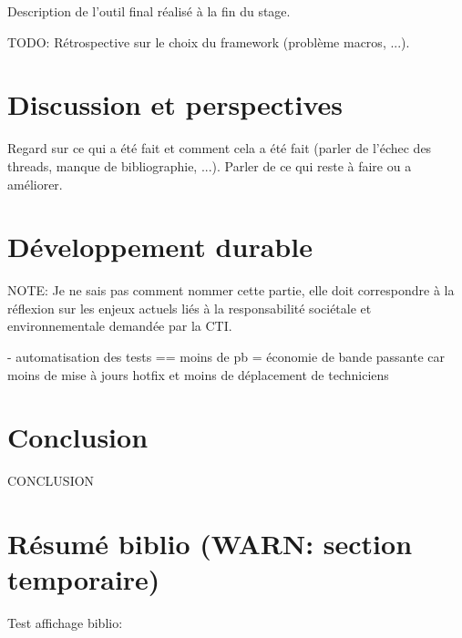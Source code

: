 \documentclass[a4paper]{article}
\begin{document}
Description de l'outil final réalisé à la fin du stage.

TODO: Rétrospective sur le choix du framework (problème macros, ...).

\clearpage

\section{Discussion et perspectives}

Regard sur ce qui a été fait et comment cela a été fait (parler de l'échec
des threads, manque de bibliographie, ...). Parler de ce qui reste à faire ou a
améliorer.

\clearpage

\section{Développement durable}

NOTE: Je ne sais pas comment nommer cette partie, elle doit correspondre à la
réflexion sur les enjeux actuels liés à la responsabilité sociétale et
environnementale demandée par la CTI.

- automatisation des tests == moins de pb = économie de bande passante car moins
  de mise à jours hotfix et moins de déplacement de techniciens

\clearpage

\section*{Conclusion}

CONCLUSION



\section{Résumé biblio (WARN: section temporaire)}

Test affichage biblio:
\end{document}
